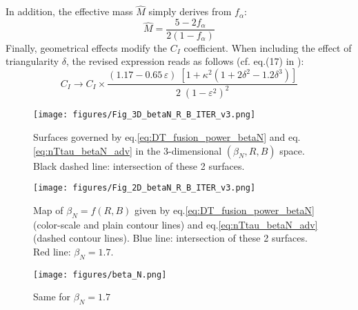 In addition, the effective mass $\hat M$ simply derives from $f_\alpha$:
\begin{equation*}
	\hat M = \frac{5  - 2f_\alpha}{2(1-f_\alpha)}
\end{equation*}
Finally, geometrical effects modify the $C_I$ coefficient. When including the effect of triangularity $\delta$, the revised expression reads as follows (cf. eq.(17) in ):
\begin{equation*}
	C_I \to C_I \times 
	\frac{(1.17-0.65\, \varepsilon)\; \left[ 1+\kappa^2(1+2\delta^2-1.2\delta^3) \right]} {2\;(1-\varepsilon^2)^2}
\end{equation*}

\begin{figure}[h]
	\centering
	\texttt{[image: figures/Fig\_3D\_betaN\_R\_B\_ITER\_v3.png]}
	\caption{Surfaces governed by eq.\ref{eq:DT_fusion_power_betaN} and eq.\ref{eq:nTtau_betaN_adv} in the 3-dimensional $(\beta_N,R,B)$ space. Black dashed line: intersection of these 2 surfaces.}
	\label{fig:R_B_betaN_3D}
\end{figure}

\begin{figure}[h]
	\centering
	\texttt{[image: figures/Fig\_2D\_betaN\_R\_B\_ITER\_v3.png]}%
	\caption{Map of $\beta_N=f(R,B)$ given by eq.\ref{eq:DT_fusion_power_betaN} (color-scale and plain contour lines) and eq.\ref{eq:nTtau_betaN_adv} (dashed contour lines). Blue line: intersection of these 2 surfaces. Red line: $\beta_N = 1.7$.}
\end{figure}

\begin{figure}[h]
	\centering
	\texttt{[image: figures/beta\_N.png]}
	\caption{Same for $\beta_N=1.7$}
	\label{fig:solutions_betaN2}
\end{figure}

